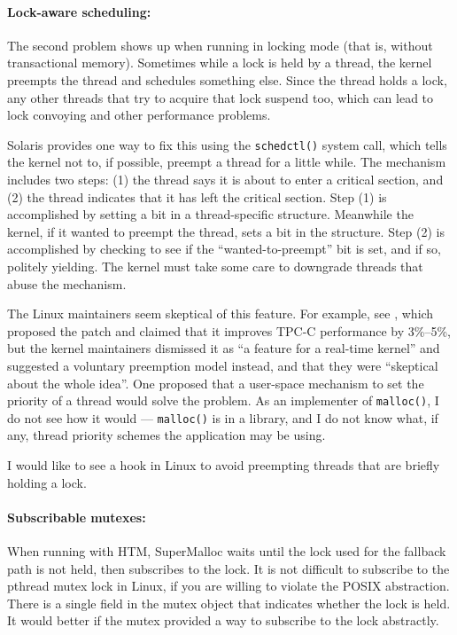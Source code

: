 \documentclass[natbib,sort&compress]{sigplanconf}
\newcommand{\code}[1]{\texttt{#1}}
\begin{document}
{\paragraph{Lock-aware scheduling:}} The second problem shows up when
running in locking mode (that is, without transactional
memory).  Sometimes while a lock is held by a thread, the kernel
preempts the thread and schedules something else.  Since the thread
holds a lock, any other threads that try to acquire that lock suspend
too, which can lead to lock convoying and other performance problems.

Solaris provides one way to fix this using the \code{schedctl()}
system call, which tells the kernel not to, if possible, preempt a
thread for a little while\cite{Dice11}.  The mechanism includes two
steps: (1) the thread says it is about to enter a critical section,
and (2) the thread indicates that it has left the critical section.
Step (1) is accomplished by setting a bit in a thread-specific
structure.  Meanwhile the kernel, if it wanted to preempt the thread,
sets a bit in the structure.  Step (2) is accomplished by checking to
see if the ``wanted-to-preempt'' bit is set, and if so, politely
yielding.  The kernel must take some care to downgrade threads that
abuse the mechanism.

The Linux maintainers seem skeptical of this feature.  For example,
see \cite{Aziz14}, which proposed the patch and claimed that it
improves TPC-C performance by 3\%--5\%, but the kernel maintainers
dismissed it as ``a feature for a real-time kernel'' and suggested a
voluntary preemption model instead, and that they were ``skeptical
about the whole idea''.  One proposed \cite{Oboguev14a, Oboguev14b}
that a user-space mechanism to set the priority of a thread would solve
the problem.  As an implementer of \code{malloc()}, I do not see how it
would --- \code{malloc()} is in a library, and I do not know what, if
any, thread priority schemes the application may be using.

I would like to see a hook in Linux to avoid preempting threads that
are briefly holding a lock.

{\paragraph{Subscribable mutexes:}} When running with HTM, SuperMalloc waits
until the lock used for the fallback path is not held, then 
subscribes to the lock.  It is not difficult to subscribe to the
pthread mutex lock in Linux, if you are willing to violate the POSIX
abstraction.  There is a single field in the mutex object that
indicates whether the lock is held.  It would better if the mutex
provided a way to subscribe to the lock abstractly.
\end{document}
